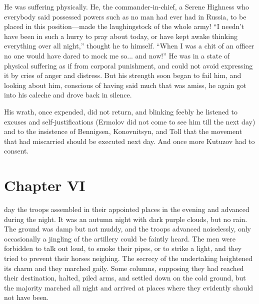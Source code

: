 He was suffering physically. He, the commander-in-chief, a Serene
Highness who everybody said possessed powers such as no man had
ever had in Russia, to be placed in this position---made the
laughingstock of the whole army! ``I needn't have been in such a
hurry to pray about today, or have kept awake thinking everything
over all night,'' thought he to himself. ``When I was a chit of
an officer no one would have dared to mock me so... and now!'' He
was in a state of physical suffering as if from corporal
punishment, and could not avoid expressing it by cries of anger
and distress. But his strength soon began to fail him, and
looking about him, conscious of having said much that was amiss,
he again got into his caleche and drove back in silence.

His wrath, once expended, did not return, and blinking feebly he
listened to excuses and self-justifications (Ermolov did not come
to see him till the next day) and to the insistence of Bennigsen,
Konovnitsyn, and Toll that the movement that had miscarried
should be executed next day. And once more Kutuzov had to
consent.


\chapter*{Chapter VI} \ifaudio {}
\fi

 day the troops assembled in their appointed places in the
evening and advanced during the night. It was an autumn night
with dark purple clouds, but no rain. The ground was damp but not
muddy, and the troops advanced noiselessly, only occasionally a
jingling of the artillery could be faintly heard. The men were
forbidden to talk out loud, to smoke their pipes, or to strike a
light, and they tried to prevent their horses neighing. The
secrecy of the undertaking heightened its charm and they marched
gaily. Some columns, supposing they had reached their
destination, halted, piled arms, and settled down on the cold
ground, but the majority marched all night and arrived at places
where they evidently should not have been.

